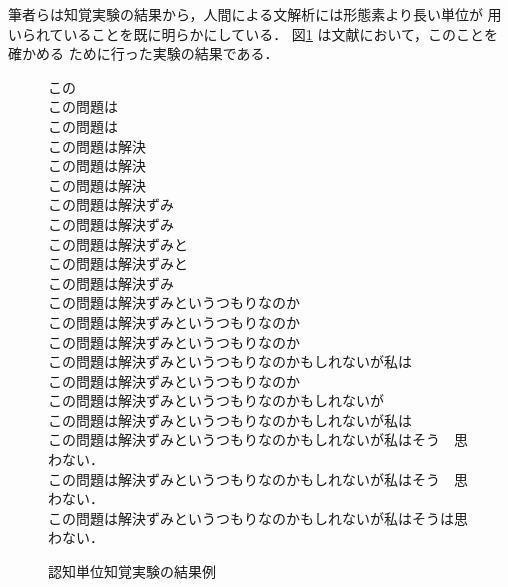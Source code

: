 筆者らは知覚実験の結果から，人間による文解析には形態素より長い単位が
用いられていることを既に明らかにしている\cite{yoko,yoko0}．
図\ref{zu1} は文献\cite{yoko0}において，このことを確かめる
ために行った実験の結果である．

\begin{figure}[tbh]
\begin{flushleft}
\small
{} この\\
 この問題は\\
 この問題は\\
 この問題は解決\\
 この問題は解決\\
 この問題は解決\\
 この問題は解決ずみ\\
 この問題は解決ずみ\\
 この問題は解決ずみと\\
 この問題は解決ずみと\\
 この問題は解決ずみ\\
 この問題は解決ずみというつもりなのか\\
 この問題は解決ずみというつもりなのか\\
 この問題は解決ずみというつもりなのか\\
 この問題は解決ずみというつもりなのかもしれないが私は\\
 この問題は解決ずみというつもりなのか\\
 この問題は解決ずみというつもりなのかもしれないが\\
 この問題は解決ずみというつもりなのかもしれないが私は\\
 この問題は解決ずみというつもりなのかもしれないが私はそう　思わない．\\
 この問題は解決ずみというつもりなのかもしれないが私はそう　思わない．\\
 この問題は解決ずみというつもりなのかもしれないが私はそうは思わない．\\
\end{flushleft}
\caption{認知単位知覚実験の結果例} \label{zu1}
\end{figure}



